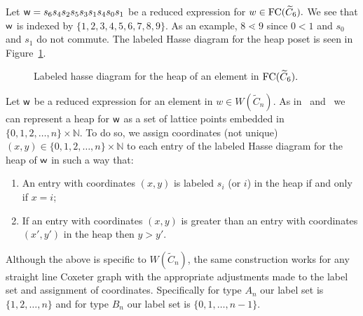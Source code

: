 \begin{example}
Let $\mathsf{w}=s_6s_4s_2s_5s_3s_1s_4s_0s_1$ be a reduced expression for $w \in \mathrm{FC}(\widetilde{C}_6).$ We see that $\mathsf{w}$ is indexed by $\{1,2,3,4,5,6,7,8,9\}$. As an example, $8 \lessdot 9$ since $0 <1$ and $s_0$ and $s_1$ do not commute. The labeled Hasse diagram for the heap poset is seen in Figure~\ref{fig:Hasse}.
\begin{figure}[h]
\centering
{}
\caption{Labeled hasse diagram for the heap of an element in $\mathrm{FC}(\widetilde{C}_6).$}
\label{fig:Hasse}	
\end{figure}
\end{example}

Let $\mathsf{w}$ be a reduced expression for an element in $w \in W(\widetilde{C}_n)$. As in~\cite{Billey2007} and~\cite{Ernst2010} we can represent a heap for $\mathsf{w}$ as a set of lattice points embedded in $\{0,1,2,\ldots, n\} \times \mathbb{N}$. To do so, we assign coordinates (not unique) $(x,y) \in \{0,1,2,\ldots, n\} \times \mathbb{N}$ to each entry of the labeled Hasse diagram for the heap of $\mathsf{w}$ in such a way that:
\begin{enumerate}
\item An entry with coordinates $(x,y)$ is labeled $s_i$ (or $i$) in the heap if and only if $x = i$; 

\item If an entry with coordinates $(x,y)$ is greater than an entry with coordinates $(x',y')$ in the heap then $y > y'$.
\end{enumerate}

Although the above is specific to $W(\widetilde{C}_n)$, the same construction works for any straight line Coxeter graph with the appropriate adjustments made to the label set and assignment of coordinates. Specifically for type $A_n$ our label set is $\{1,2, \ldots, n\}$ and for type $B_n$ our label set is $\{0,1, \ldots, n-1\}$.


